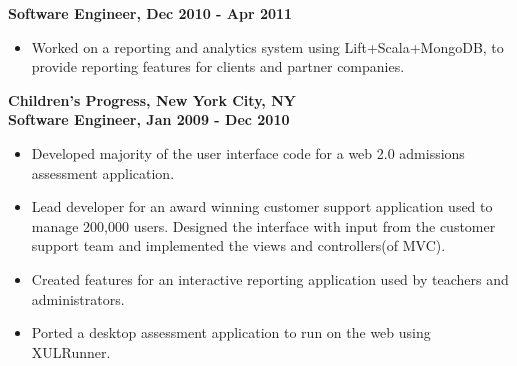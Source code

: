 \documentclass{article}
\begin{document}
\begin{minipage}[t]{3.8in}
      {\bf Software Engineer,  Dec 2010 - Apr 2011} 
      \begin{itemize}
      \item
      Worked on a reporting and analytics system using Lift+Scala+MongoDB, to provide reporting features for clients and partner companies.
      \end{itemize}
      {\bf Children's Progress, New York City, NY} \\
      {\bf Software Engineer, Jan 2009 - Dec 2010} 
      \begin{itemize}
      \item
      Developed majority of the user interface code for a web 2.0 admissions assessment application. 
      \item
      Lead developer for an award winning customer support application used to manage 200,000 users. Designed the interface with input from the customer support team and implemented the views and controllers(of MVC).  
      \item
      Created features for an interactive reporting application used by teachers and administrators.
            \item
      Ported a desktop assessment application to run on the web using XULRunner.
      \end{itemize}
\end{minipage}
\hfill
\end{document}

